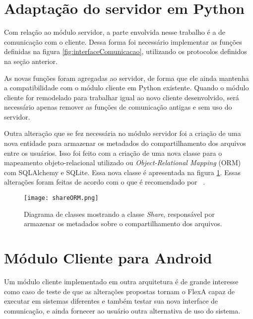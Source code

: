         \section{Adaptação do servidor em Python}
        
        
        Com relação ao módulo servidor, a parte envolvida nesse trabalho é a de comunicação com o cliente. Dessa forma foi necessário implementar as funções definidas na figura \ref{fig:interfaceComunicacao}, utilizando os protocolos definidos na seção anterior.
        
        As novas funções foram agregadas ao servidor, de forma que ele ainda mantenha a compatibilidade com o módulo cliente em Python existente. Quando o módulo cliente for remodelado para trabalhar igual ao novo cliente desenvolvido, será necessário apenas remover as funções de comunicação antigas e sem uso do servidor.
        
        Outra alteração que se fez necessária no módulo servidor foi a criação de uma nova entidade para armazenar os metadados do compartilhamento dos arquivos entre os usuários. Isso foi feito com a criação de uma nova classe para o mapeamento objeto-relacional utilizado ou \textit{Object-Relational Mapping} (ORM) com SQLAlchemy e SQLite. Essa nova classe é apresentada na figura \ref{fig:shareORM}. Essas alterações foram feitas de acordo com o que é recomendado por ~\cite{sqlalchemy}.
        
        \begin{figure}
        \centering
        \texttt{[image: shareORM.png]}
        \caption{Diagrama de classes mostrando a classe \textit{Share}, responsável por armazenar os metadados sobre o compartilhamento dos arquivos.}
        \label{fig:shareORM}
        \end{figure}
        
        \section{Módulo Cliente para Android}
        
     
        Um módulo cliente implementado em outra arquitetura é de grande interesse como caso de teste de que as alterações propostas tornam o FlexA capaz de executar em sistemas diferentes e também testar sua nova interface de comunicação, e ainda fornecer ao usuário outra alternativa de uso do sistema.
        
